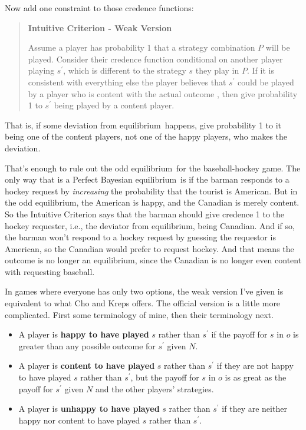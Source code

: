 \documentclass[openany]{book}
\newcommand{\eqm}{equilibrium}
\begin{document}
Now add one constraint to those credence functions:

\begin{quote}
\textbf{Intuitive Criterion - Weak Version}

Assume a player has probability 1 that a strategy combination $P$ will be played. Consider their credence function conditional on another player playing $s^\prime$, wh\-ich is different to the strategy $s$ they play in $P$. If it is consistent with everything else the player believes that $s^\prime$ could be played by a player who is content with the actual outcome , then give probability 1 to $s^\prime$ being played by a content player.
\end{quote}

\noindent That is, if some deviation from \eqm\ happens, give probability 1 to it being one of the content players, not one of the happy players, who makes the deviation.

That's enough to rule out the odd \eqm\ for the baseball-hockey game. The only way that is a Perfect Bayesian \eqm\ is if the barman responds to a hockey request by \textit{increasing} the probability that the tourist is American. But in the odd \eqm, the American is happy, and the Canadian is merely content. So the Intuitive Criterion says that the barman should give credence 1 to the hockey requester, i.e., the deviator from \eqm, being Canadian. And if so, the barman won't respond to a hockey request by guessing the requestor is American, so the Canadian would prefer to request hockey. And that means the outcome is no longer an \eqm, since the Canadian is no longer even content with requesting baseball.

In games where everyone has only two options, the weak version I've given is equivalent to what Cho and Kreps offers. The official version is a little more complicated. First some terminology of mine, then their terminology next.

\begin{itemize}
\item A player is \textbf{happy to have played} $s$ rather than $s^\prime$ if the payoff for $s$ in $o$ is greater than any possible outcome for $s^\prime$ given $N$.
\item A player is \textbf{content to have played} $s$ rather than $s^\prime$ if they are not happy to have played $s$ rather than $s^\prime$, but the payoff for $s$ in $o$ is as great as the payoff for $s^\prime$ given $N$ and the other players' strategies.
\item A player is \textbf{unhappy to have played} $s$ rather than $s^\prime$ if they are neither happy nor content to have played $s$ rather than $s^\prime$.
\end{itemize}
\end{document}
